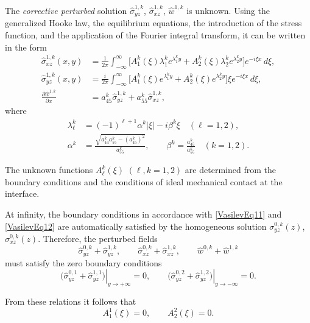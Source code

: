 The \emph{corrective perturbed} solution
$\widehat{\sigma}_{yz}^{1,k}$,
$\widehat{\sigma}_{xz}^{1,k}$,
$\widehat{w}^{1,k}$
is unknown. Using the generalized Hooke law, the equilibrium equations, the introduction of the stress function, and the application of the Fourier integral transform, it can be written in the form~\cite{Vasilev23,Vasilev27}
\begin{equation}
	\begin{aligned}
		\widehat{\sigma}_{xz}^{1,k}(x,y)
		&=
		\frac{1}{2\pi}
		\int_{-\infty}^{\infty}
		\Big[
		A_{1}^{k}(\xi)\lambda_{1}^{k}e^{\lambda_{1}^{k}y}
		+
		A_{2}^{k}(\xi)\lambda_{2}^{k}e^{\lambda_{2}^{k}y}
		\Big]
		e^{-i\xi x}\,d\xi, \\
		\widehat{\sigma}_{yz}^{1,k}(x,y)
		&=
		\frac{i}{2\pi}
		\int_{-\infty}^{\infty}
		\Big[
		A_{1}^{k}(\xi)e^{\lambda_{1}^{k}y}
		+
		A_{2}^{k}(\xi)e^{\lambda_{2}^{k}y}
		\Big]
		\xi e^{-i\xi x}\,d\xi, \\
		\frac{\partial \widehat{w}^{1,k}}{\partial x}
		&=
		a_{45}^{k}\widehat{\sigma}_{yz}^{1,k}
		+
		a_{55}^{k}\widehat{\sigma}_{xz}^{1,k},
	\end{aligned}
	\label{VasilevEq14}
\end{equation}
%
where
\begin{align*}
\lambda_{\ell}^{k}
&=
(-1)^{\ell+1}\alpha^{k}|\xi|-i\beta^{k}\xi
\quad
(\ell=1,2),
\\
	\alpha^{k}
	&=
	\frac{\sqrt{a_{44}^{k}a_{55}^{k}-(a_{45}^{k})^{2}}}{a_{55}^{k}},
	\qquad
	\beta^{k}
	=
	\frac{a_{45}^{k}}{a_{55}^{k}}
	\quad
	(k=1,2).
\end{align*}

The unknown functions $A_{\ell}^{k}(\xi)$ $(\ell,k=1,2)$ are determined from the boundary conditions and the conditions of ideal mechanical contact at the interface.

At infinity, the boundary conditions in accordance with \eqref{VasilevEq11} and \eqref{VasilevEq12} are automatically satisfied by the homogeneous solution
$\sigma_{yz}^{0,k}(z)$, $\sigma_{xz}^{0,k}(z)$.
Therefore, the perturbed fields
\[
\widehat{\sigma}_{yz}^{0,k}+\widehat{\sigma}_{yz}^{1,k},
\qquad
\widehat{\sigma}_{xz}^{0,k}+\widehat{\sigma}_{xz}^{1,k},
\qquad
\widehat{w}^{0,k}+\widehat{w}^{1,k}
\]
must satisfy the zero boundary conditions
\[
\left.
\big(\widehat{\sigma}_{yz}^{0,1}+\widehat{\sigma}_{yz}^{1,1}\big)
\right|_{y\to +\infty}=0,
\qquad
\left.
\big(\widehat{\sigma}_{yz}^{0,2}+\widehat{\sigma}_{yz}^{1,2}\big)
\right|_{y\to -\infty}=0.
\]

From these relations it follows that
\begin{equation}
	A_{1}^{1}(\xi)=0,
	\qquad
	A_{2}^{2}(\xi)=0.
	\label{VasilevEq15}
\end{equation}

